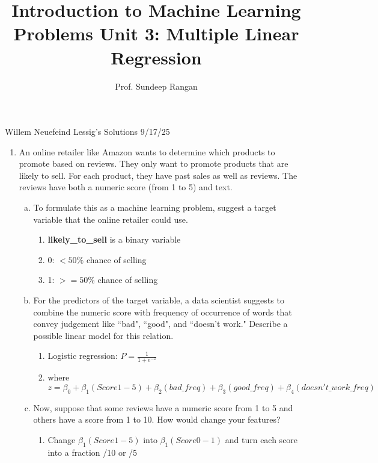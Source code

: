 \documentclass[11pt]{article}
\begin{document}
\title{Introduction to Machine Learning\\
Problems Unit 3:  Multiple Linear Regression}
\author{Prof. Sundeep Rangan}
\date{}

\maketitle
Willem Neuefeind Lessig's Solutions
9/17/25
\begin{enumerate}

\item An online retailer like Amazon wants to determine which products
 to promote based on reviews.  They only want to promote products that are likely
 to sell. For each product, they have past sales as well as
 reviews.  The reviews have both a numeric score (from 1 to 5) and text.
\begin{enumerate}[(a)]
\item To formulate this as a machine learning problem, suggest
a target variable that the online retailer could use.
\begin{enumerate}
    \item \textbf{likely\_to\_sell} is a binary variable

        \item 0: $<50\%$ chance of selling
        \item 1: $>= 50\%$ chance of selling
\end{enumerate}
\item For the predictors of the target variable, a data scientist
suggests to combine the numeric score with frequency of occurrence
of words that convey judgement like ``bad", ``good", and ``doesn't work."
Describe a possible linear model for this relation.
\begin{enumerate}
    \item Logistic regression: \(P = \frac{1}{1+e^{-z}}\)
    \item where \(z= \beta_0+\beta_1(Score 1-5)+\beta_2(bad\_freq)+\beta_3(good\_freq)+\beta_4(doesn't\_work\_freq)\)
\end{enumerate}

\item Now, suppose that
some reviews have a numeric score from 1 to 5 and others have a score
from 1 to 10.  How would change your features?
\begin{enumerate}
    \item Change \(\beta_1(Score 1-5)\) into \(\beta_1(Score0-1)\) and turn each score into a fraction /10 or /5
\end{enumerate}


\end{enumerate}
\end{enumerate}
\end{document}
